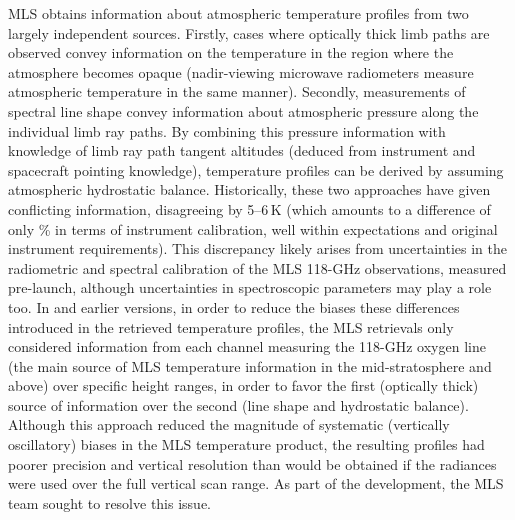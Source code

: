 MLS obtains information about atmospheric temperature profiles from two largely independent sources. Firstly, cases where optically thick limb paths are observed convey information on the temperature in the region where the atmosphere becomes opaque (nadir-viewing microwave radiometers measure atmospheric temperature in the same manner).  Secondly, measurements of spectral line shape convey information about atmospheric pressure along the individual limb ray paths.  By combining this pressure information with knowledge of limb ray path tangent altitudes (deduced from instrument and spacecraft pointing knowledge), temperature profiles can be derived by assuming atmospheric hydrostatic balance.  Historically, these two approaches have given conflicting information, disagreeing by 5--6\,K (which amounts to a difference of only \% in terms of instrument calibration, well within expectations and original instrument requirements). This discrepancy likely arises from uncertainties in the radiometric and spectral calibration of the MLS \mbox{118-GHz} observations, measured pre-launch, although uncertainties in spectroscopic parameters may play a role too.  In \prevv and earlier versions, in order to reduce the biases these differences introduced in the retrieved temperature profiles, the MLS retrievals only considered information from each channel measuring the \mbox{118-GHz} oxygen line (the main source of MLS temperature information in the mid-stratosphere and above) over specific height ranges, in order to favor the first (optically thick) source of information over the second (line shape and hydrostatic balance). Although this approach reduced the magnitude of systematic (vertically oscillatory) biases in the MLS temperature product, the resulting profiles had poorer precision and vertical resolution than would be obtained if the radiances were used over the full vertical scan range. As part of the \thisv development, the MLS team sought to resolve this issue.

